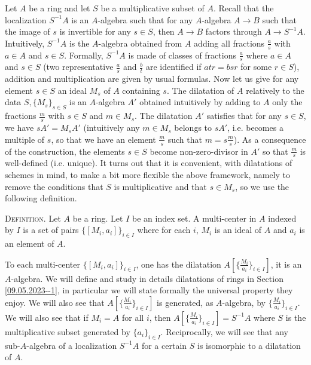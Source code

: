 \documentclass[10pt]{alggeom}
\theoremstyle{definition}
\numberwithin{equation}{section}
\begin{document}
Let $A$ be a ring and let $S$ be a multiplicative subset of $A$. Recall that the localization $S^{-1}A$ is an $A$-algebra such that for any $A$-algebra $ A \to B $ such that the image of $s$ is invertible for any $s \in S$, then $A \to B$ factors through $A \to S^{-1}A$. Intuitively, $S^{-1}A$ is the $A$-algebra obtained from $A$ adding all fractions $\frac{a}{s}$ with $a \in A $ and $s \in S$.
Formally, $S^{-1} A$ is made of classes of fractions $\frac{a}{s}$ where $a \in A$ and $s \in S $ (two representative $\frac{a}{s}$ and $\frac{b}{t}$ are identified if $atr=bsr$ for some $r \in S$), addition and multiplication are given by usual formulas. Now let us give for any element $s \in S$ an ideal $M_s$ of $A$ containing $s$. The dilatation of $A$ relatively to the data $S, \{M_s \}_{s \in S}$ is an $A$-algebra $A'$ obtained intuitively by adding to $A$ only the fractions $\frac{m}{s}$ with $s \in S $ and $m \in M_s$. The dilatation $A'$ satisfies that for any $s \in S$, we have $s A'= M_s A' $ (intuitively any $m \in M_s$ belongs to $s A'$, i.e. becomes a multiple of $s$, so that we have an element $\frac{m}{s} $ such that $m = s  \frac{m}{s} $). As a consequence of the construction, the elements $s \in S$ become non-zero-divisor in $A'$ so that $\frac{m}{s}$ is well-defined (i.e. unique). It turns out that it is convenient, with dilatations of schemes in mind, to make a bit more flexible the above framework, namely to remove the conditions that $S$ is multiplicative and that $s \in M_s$, so we use the following definition. 

\begin{flushleft}
\textsc{Definition.} Let $A$ be a ring. Let $I$ be an index set. A multi-center in $A$ indexed by $I$ is a set of pairs $\{[M_i , a_i ]\}_{i \in I}$ where for each $i$, $M_i$ is an ideal of $A$ and $a_i$ is an element of $A$.
\end{flushleft}
 

To each multi-center $\{[M_i , a_i ]\}_{i \in I}$, one has the dilatation $A [\{\frac{M_i}{a_i}\}_{i \in I}]$, it is an $A$-algebra.  We will define and study in details dilatations of rings in Section \ref{09.05.2023--1}, in particular we will state formally the universal property they enjoy. We will also see that $A [\{\frac{M_i}{a_i}\}_{i \in I}]$ is generated, as $A$-algebra, by $\{\frac{M_i}{a_i}\}_{i \in I}$. We will also see that if $M_i = A$ for all $i$, then $A [\{\frac{M_i}{a_i}\}_{i \in I}]= S^{-1} A$ where $S$ is the multiplicative subset generated by $\{a _i \} _{i \in I }$. Reciprocally, we will see that any sub-$A$-algebra of a localization $S^{-1} A$ for a certain $S$ is isomorphic to a dilatation of $A$. 
\end{document}
